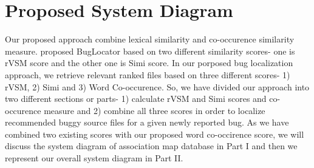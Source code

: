 \documentclass{sig-alternate}
\begin{document}
\section{Proposed System Diagram}\label{sec:proposedsystemDiagram}
Our proposed approach combine lexical similarity and co-occurence similarity measure.  \citet{Jian} proposed BugLocator based on two different similarity scores- one is rVSM score and the other one is Simi score. In our porposed bug localization approach, we retrieve relevant ranked files based on three different scores- 1) rVSM, 2) Simi and 3) Word Co-occurence. So,
we have divided our approach into two different sections or parts- 1) calculate rVSM and Simi scores and co-occurence measure and 2) combine all three scores in order to localize recommended buggy source files for a given newly reported bug. As we have combined two existing scores with our proposed word co-occirence score, we will discuss the system diagram of association map database in Part I and then we represent our overall system diagram in Part II.
%
%
\end{document}

